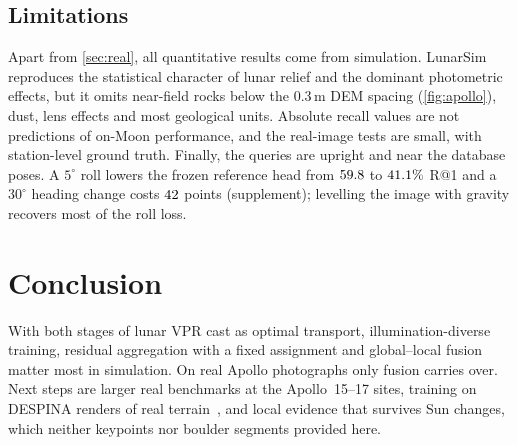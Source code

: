 \subsection{Limitations}\label{sec:limits}
Apart from \cref{sec:real}, all quantitative results come from simulation. LunarSim reproduces the statistical character of
lunar relief and the dominant photometric effects, but it omits near-field rocks below the $0.3$\,m DEM spacing (\cref{fig:apollo}), dust, lens
effects and most geological units. Absolute recall values are not predictions of on-Moon
performance, and the real-image tests are small, with station-level ground truth. Finally, the queries are upright and near the database poses. A $5^\circ$ roll
lowers the frozen reference head from $59.8$ to $41.1\%$ R@1 and a $30^\circ$ heading change costs
$42$ points (supplement); levelling the image with gravity recovers most of the roll loss.

\section{Conclusion}\label{sec:conclusion}
With both stages of lunar VPR cast as optimal transport, illumination-diverse training, residual
aggregation with a fixed assignment and global--local fusion matter most in simulation. On real
Apollo photographs only fusion carries over. Next steps are larger real benchmarks at the Apollo~15--17 sites, training on DESPINA renders
of real terrain~\cite{nelsonarcher2026despina}, and local evidence that survives Sun changes, which neither keypoints nor boulder
segments provided here.
